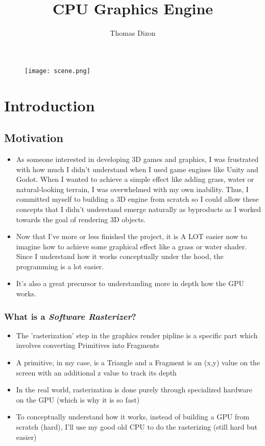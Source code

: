 \documentclass{article}
\author{Thomas Dizon}
\title{CPU Graphics Engine}
\begin{document}
\maketitle

\begin{figure}[h]
	\centering
	\texttt{[image: scene.png]}
	\caption{}
\end{figure}

\newpage

\tableofcontents

\newpage

\section{Introduction}

\subsection{Motivation}
\begin{itemize}
	\item As someone interested in developing 3D games and graphics, I was frustrated with how much I didn't understand when I used game engines like Unity and Godot. When I wanted to achieve a simple effect like adding grass, water or natural-looking terrain, I was overwhelmed with my own inability. Thus, I committed myself to building a 3D engine from scratch so I could allow these concepts that I didn't understand emerge naturally as byproducts as I worked towards the goal of rendering 3D objects. 
\item Now that I've more or less finished the project, it is A LOT easier now to imagine how to achieve some graphical effect like a grass or water shader. Since I understand how it works conceptually under the hood, the programming is a lot easier.
\item It's also a great precursor to understanding more in depth how the GPU works.
\end{itemize}

\subsubsection{What is a \textit{Software Rasterizer}?}
\begin{itemize}
\item The 'rasterization' step in the graphics render pipline is a specific part which involves converting Primitives into Fragments
\item A primitive, in my case, is a Triangle and a Fragment is an (x,y) value on the screen with an additional z value to track its depth
\item In the real world, rasterization is done purely through specialized hardware on the GPU (which is why it is so fast)
\item To conceptually understand how it works, instead of building a GPU from scratch (hard), I'll use my good old CPU to do the rasterizing (still hard but easier)
\end{itemize}
\end{document}
